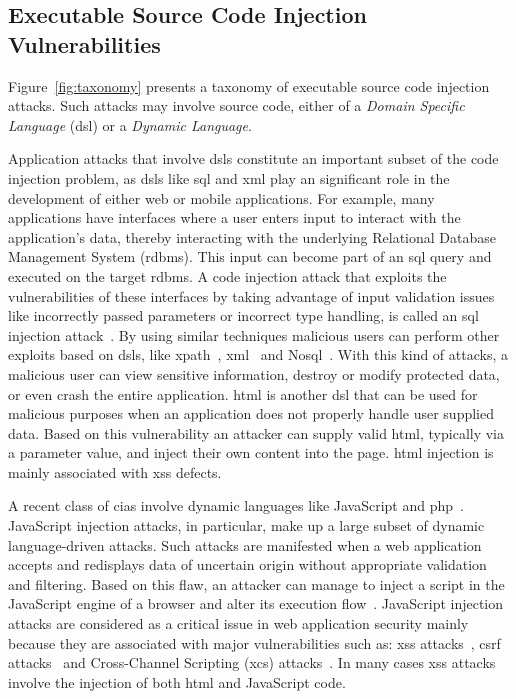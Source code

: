 \documentclass[conference]{IEEEtran}
\begin{document}
\subsection{Executable Source Code Injection Vulnerabilities}

Figure~\ref{fig:taxonomy} presents a taxonomy of executable source
code injection attacks. Such attacks may involve source code, either of a
{\it Domain Specific Language} ({\sc dsl}) or a {\it Dynamic Language}.

Application attacks that involve {\sc dsl}s constitute an important
subset of the code injection problem, as {\sc dsl}s like {\sc sql} and
{\sc xml} play an significant role in the development of either web or
mobile applications. For example, many applications have interfaces
where a user enters input to interact with the application's data,
thereby interacting with the underlying Relational Database Management
System ({\sc rdbms}). This input can become part of an {\sc sql} query
and executed on the target {\sc rdbms}. A code injection attack that
exploits the vulnerabilities of these interfaces by taking advantage
of input validation issues like incorrectly passed parameters or
incorrect type handling, is called an {\sc sql} injection
attack~\cite{CERT02,MS09,HVO06,SW06}. By using similar techniques
malicious users can perform other exploits based on {\sc dsl}s,
like {\sc xp}ath~\cite{SW06,CDL07,MKS09}, {\sc xml}~\cite{MSM13}
and No{\sc sql}~\cite{SMS13}. With this kind of attacks,
a malicious user can view sensitive information,
destroy or modify protected data, or even crash the entire
application. {\sc html} is another {\sc dsl} that can be used
for malicious purposes when an application does not properly
handle user supplied data. Based on this vulnerability
an attacker can supply valid {\sc html},
typically via a parameter value, and inject their own
content into the page. {\sc html} injection is mainly associated
with {\sc xss} defects.

A recent class of {\sc cia}s involve dynamic languages like
JavaScript and {\sc php}~\cite{SFVM09,EWKK09,SMS13}. JavaScript
injection attacks, in particular, make up a large subset of dynamic
language-driven attacks. Such attacks are manifested when a web
application accepts and redisplays data of uncertain origin without
appropriate validation and filtering. Based on this flaw, an attacker
can manage to inject a script in the JavaScript engine of a browser
and alter its execution flow~\cite{ELX07}. JavaScript injection
attacks are considered as a critical issue in web application security
mainly because they are associated with major vulnerabilities such as:
{\sc xss} attacks~\cite{SG07}, {\sc csrf} attacks~\cite{LZRL09} and
Cross-Channel Scripting ({\sc xcs}) attacks~\cite{W10,BBB09}.
In many cases {\sc xss} attacks involve the injection of
both {\sc html} and JavaScript code.
\end{document}
